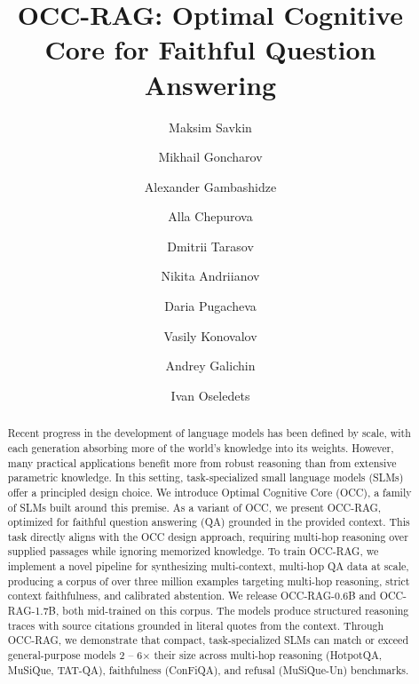 \documentclass{llmxive}
\title{OCC-RAG: Optimal Cognitive Core for Faithful Question Answering}
\author{Maksim Savkin \and Mikhail Goncharov \and Alexander Gambashidze \and Alla Chepurova \and Dmitrii Tarasov \and Nikita Andriianov \and Daria Pugacheva \and Vasily Konovalov \and Andrey Galichin \and Ivan Oseledets}
\begin{document}
\maketitle
\begin{abstract}
Recent progress in the development of language models has been defined by scale, with each generation absorbing more of the world's knowledge into its weights. However, many practical applications benefit more from robust reasoning than from extensive parametric knowledge. In this setting, task-specialized small language models (SLMs) offer a principled design choice. We introduce Optimal Cognitive Core (OCC), a family of SLMs built around this premise. As a variant of OCC, we present OCC-RAG, optimized for faithful question answering (QA) grounded in the provided context. This task directly aligns with the OCC design approach, requiring multi-hop reasoning over supplied passages while ignoring memorized knowledge. To train OCC-RAG, we implement a novel pipeline for synthesizing multi-context, multi-hop QA data at scale, producing a corpus of over three million examples targeting multi-hop reasoning, strict context faithfulness, and calibrated abstention. We release OCC-RAG-0.6B and OCC-RAG-1.7B, both mid-trained on this corpus. The models produce structured reasoning traces with source citations grounded in literal quotes from the context. Through OCC-RAG, we demonstrate that compact, task-specialized SLMs can match or exceed general-purpose models 2 -- 6$\times$ their size across multi-hop reasoning (HotpotQA, MuSiQue, TAT-QA), faithfulness (ConFiQA), and refusal (MuSiQue-Un) benchmarks.
\end{abstract}
\end{document}

